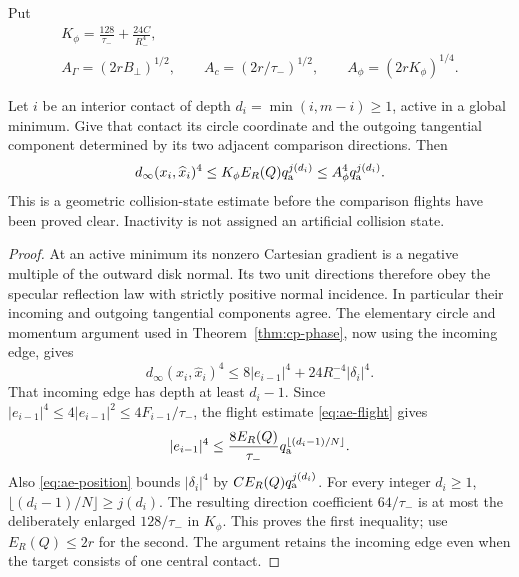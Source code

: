 Put
\begin{equation}\label{eq:ec-amplitudes}
 \begin{gathered}
 K_\phi=\frac{128}{\tau_-}+\frac{24C}{R_-^4},\\
 A_\Gamma=(2rB_\perp)^{1/2},\qquad
 A_c=(2r/\tau_-)^{1/2},\qquad
 A_\phi=(2rK_\phi)^{1/4}.
 \end{gathered}
\end{equation}

\begin{lemma}
\label{lem:ec-active-phase}
Let $i$ be an interior contact of depth $d_i=\min(i,m-i)\ge1$,
active in a global minimum.  Give that contact its circle coordinate
and the outgoing tangential component determined by its two adjacent
comparison directions.  Then
\begin{equation}\label{eq:ec-point-phase}
 d_\infty(x_i,\widehat x_i)^4
 \le K_\phi E_R(Q)q_{\rm a}^{j(d_i)}
 \le A_\phi^4q_{\rm a}^{j(d_i)}.
\end{equation}
This is a geometric collision-state estimate before the comparison
flights have been proved clear.  Inactivity is not assigned an
artificial collision state.
\end{lemma}
\begin{proof}
At an active minimum its nonzero Cartesian gradient is a negative
multiple of the outward disk normal.  Its two unit directions
therefore obey the specular reflection law with strictly positive
normal incidence.  In particular their incoming and outgoing
tangential components agree.  The elementary circle and momentum
argument used in Theorem~\ref{thm:cp-phase}, now using the incoming
edge, gives
\[
 d_\infty(x_i,\widehat x_i)^4
 \le8|e_{i-1}|^4+24R_-^{-4}|\delta_i|^4 .
\]
That incoming edge has depth at least $d_i-1$.  Since
$|e_{i-1}|^4\le4|e_{i-1}|^2\le4F_{i-1}/\tau_-$, the flight
estimate \eqref{eq:ae-flight} gives
\[
 |e_{i-1}|^4\le
 \frac{8E_R(Q)}{\tau_-}
                     q_{\rm a}^{\lfloor(d_i-1)/N\rfloor}.
\]
Also \eqref{eq:ae-position} bounds $|\delta_i|^4$ by
$CE_R(Q)q_{\rm a}^{j(d_i)}$.
For every integer $d_i\ge1$,
$\lfloor(d_i-1)/N\rfloor\ge j(d_i)$.  The resulting direction
coefficient $64/\tau_-$ is at most the deliberately enlarged
$128/\tau_-$ in $K_\phi$.  This proves the first inequality; use
$E_R(Q)\le2r$ for the second.  The argument retains the incoming
edge even when the target consists of one central contact.
\end{proof}

